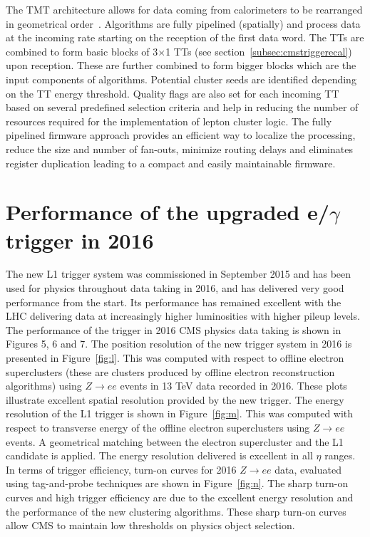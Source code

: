\documentclass[a4paper,11pt]{article}
\begin{document}
The TMT architecture allows for data coming from calorimeters to be rearranged in geometrical order~\cite{f}. Algorithms are fully pipelined (spatially) and process data at the incoming rate starting on the reception of the first data word. The TTs are combined to form basic blocks of 3$\times$1 TTs (see section~\ref{subsec:cmstriggerecal}) upon reception. These are further combined to form bigger blocks which are the input components of algorithms. Potential cluster seeds are identified depending on the TT energy threshold. Quality flags are also set for each incoming TT based on several predefined selection criteria and help in reducing the number of resources required for the implementation of lepton cluster logic. The fully pipelined firmware approach provides an efficient way to localize the processing, reduce the size and number of fan-outs, minimize routing delays and eliminates register duplication leading to a compact and easily maintainable firmware.

 
\section{Performance of the upgraded e/$\gamma$ trigger in 2016}
The new L1 trigger system was commissioned in September 2015 and has been used for physics throughout data taking in 2016, and has delivered very good performance from the start. Its performance has remained excellent with the LHC delivering data at increasingly higher luminosities with higher pileup levels. The performance of the trigger in 2016 CMS physics data taking is shown in Figures 5, 6 and 7. The position resolution of the new trigger system in 2016 is presented in Figure~\ref{fig:l}. This was computed with respect to offline electron superclusters (these are clusters produced by offline electron reconstruction algorithms) using $Z\rightarrow ee$ events in 13 TeV data recorded in 2016. These plots illustrate excellent spatial resolution provided by the new trigger.
The energy resolution of the L1 trigger is shown in Figure~\ref{fig:m}. This was computed with respect to transverse energy of the offline electron superclusters using $Z\rightarrow ee$ events. A geometrical matching between the electron supercluster and the L1 candidate is applied. The energy resolution delivered is excellent in all $\eta$ ranges. 
In terms of trigger efficiency, turn-on curves for 2016  $Z\rightarrow ee$ data, evaluated using tag-and-probe techniques are shown in Figure~\ref{fig:n}. The sharp turn-on curves and high trigger efficiency are due to the excellent energy resolution and the performance of the new clustering algorithms. These sharp turn-on curves allow CMS to maintain low thresholds on physics object selection. 
\end{document}
